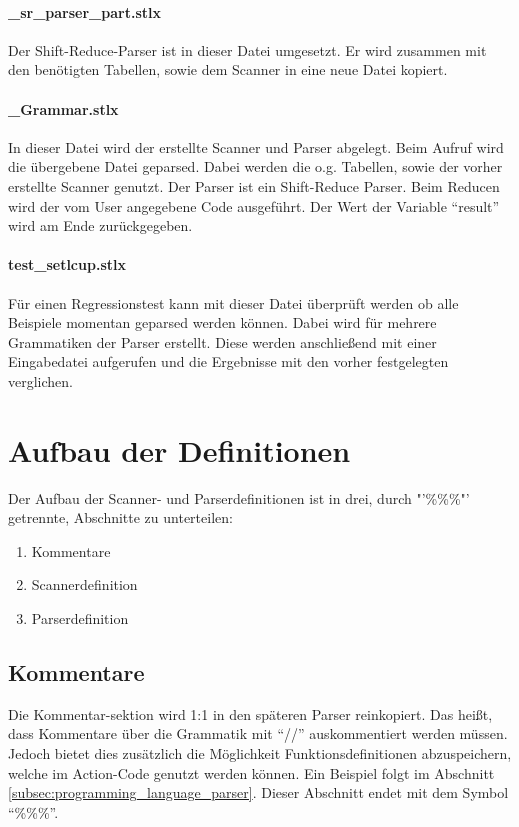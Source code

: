 \paragraph{\_sr\_parser\_part.stlx} Der Shift-Reduce-Parser ist in dieser Datei umgesetzt. Er wird zusammen mit den benötigten Tabellen, sowie dem Scanner in eine neue Datei kopiert. 
\paragraph{\_Grammar.stlx} In dieser Datei wird der erstellte Scanner und Parser abgelegt. Beim Aufruf wird die übergebene Datei geparsed. Dabei werden die o.g. Tabellen, sowie der vorher erstellte Scanner genutzt. Der Parser ist ein Shift-Reduce Parser. Beim Reducen wird der vom User angegebene Code ausgeführt. Der Wert der Variable "`result"' wird am Ende zurückgegeben.
\paragraph{test\_setlcup.stlx} Für einen Regressionstest kann mit dieser Datei überprüft werden ob alle Beispiele momentan geparsed werden können. Dabei wird für mehrere Grammatiken der Parser erstellt. Diese werden anschließend mit einer Eingabedatei aufgerufen und die Ergebnisse mit den vorher festgelegten verglichen.
\section{Aufbau der Definitionen}

Der Aufbau der Scanner- und Parserdefinitionen ist in drei, durch "'\%\%\%"' getrennte, Abschnitte zu unterteilen:
\begin{enumerate}
	\item Kommentare
	\item Scannerdefinition
	\item Parserdefinition
\end{enumerate}
\subsection{Kommentare}
Die Kommentar-sektion wird 1:1 in den späteren Parser reinkopiert.
Das heißt, dass Kommentare über die Grammatik mit "`//"' auskommentiert werden müssen.
Jedoch bietet dies zusätzlich die Möglichkeit Funktionsdefinitionen abzuspeichern, welche im Action-Code genutzt werden können. Ein Beispiel folgt im Abschnitt \ref{subsec:programming_language_parser}. 
Dieser Abschnitt endet mit dem Symbol "`\%\%\%"'. 
